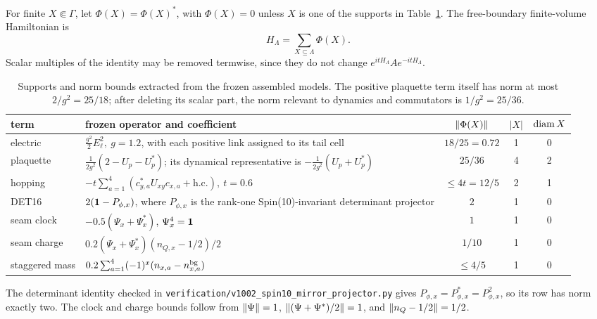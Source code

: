 \begin{definition}
For finite \(X\Subset\Gamma\), let \(\Phi(X)=\Phi(X)^*\), with
\(\Phi(X)=0\) unless \(X\) is one of the supports in
Table~\ref{tab:terms}.  The free-boundary finite-volume Hamiltonian is
\[
 H_\Lambda=\sum_{X\subseteq\Lambda}\Phi(X).
\tag{1.4}\label{eq:H}
\]
Scalar multiples of the identity may be removed termwise, since they do
not change \(e^{itH_\Lambda}Ae^{-itH_\Lambda}\).
\end{definition}

\begin{table}[ht]
\centering
\small
\begin{tabularx}{\textwidth}{@{}lXccc@{}}
\toprule
term & frozen operator and coefficient & \(\left\lVert\Phi(X)\right\rVert\) & \(|X|\) &
\(\operatorname{diam} X\)\\
\midrule
electric &
\(\frac{g^2}{2}E_\ell^2,\ g=1.2\), with each positive link assigned to
its tail cell & \(18/25=0.72\) & 1 & 0\\
plaquette &
\(\frac1{2g^2}(2-U_p-U_p^*)\); its dynamical representative is
\(-\frac1{2g^2}(U_p+U_p^*)\) & \(25/36\) & 4 & 2\\
hopping &
\(-t\sum_{a=1}^4(c_{y,a}^*U_{xy}c_{x,a}+\mathrm{h.c.}),\ t=0.6\)
& \(\leq4t=12/5\) & 2 & 1\\
DET16 &
\(2(\mathbf 1-P_{\phi,x})\), where \(P_{\phi,x}\) is the rank-one
Spin(10)-invariant determinant projector & \(2\) & 1 & 0\\
seam clock &
\(-0.5(\Psi_x+\Psi_x^*)\), \(\Psi_x^4=\mathbf 1\) & \(1\) & 1 & 0\\
seam charge &
\(0.2(\Psi_x+\Psi_x^*) (n_{Q,x}-1/2)/2\) & \(1/10\) & 1 & 0\\
staggered mass &
\(0.2\sum_{a=1}^4(-1)^x(n_{x,a}-n^{\rm bg}_{x,a})\) & \(\leq4/5\) & 1 & 0\\
\bottomrule
\end{tabularx}
\caption{Supports and norm bounds extracted from the frozen assembled
models.  The positive plaquette term itself has norm at most
\(2/g^2=25/18\); after deleting its scalar part, the norm relevant to
dynamics and commutators is \(1/g^2=25/36\).}
\label{tab:terms}
\end{table}

The determinant identity checked in
\texttt{verification/v1002\_spin10\_mirror\_projector.py} gives
\(P_{\phi,x}=P_{\phi,x}^*=P_{\phi,x}^2\), so its row has norm exactly
two.  The clock and charge bounds follow from
\(\left\lVert\Psi\right\rVert=1\), \(\left\lVert(\Psi+\Psi^*)/2\right\rVert=1\), and
\(\left\lVert n_Q-1/2\right\rVert=1/2\).

